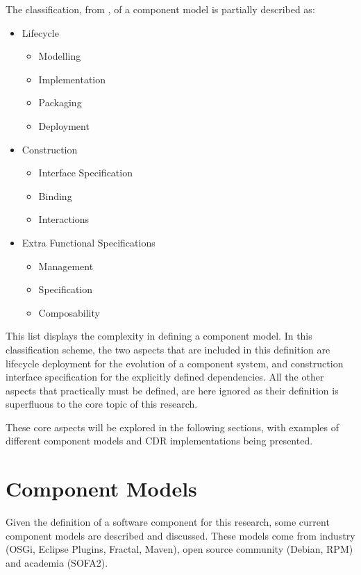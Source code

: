 The classification, from \cite{Crnkovic2011}, of a component model is partially described as:
\begin{itemize}
  \item Lifecycle 
  		\begin{itemize}
	  		\item Modelling
	  		\item Implementation
	  		\item Packaging
	  		\item Deployment
		\end{itemize}
	\item Construction
		\begin{itemize}
	  		\item Interface Specification
	  		\item Binding
	  		\item Interactions 
		\end{itemize}
	\item Extra Functional Specifications
		\begin{itemize}
	  		\item Management
	  		\item Specification
	  		\item Composability
		\end{itemize}	
\end{itemize}  
This list displays the complexity in defining a component model.
In this classification scheme, the two aspects that are included in this definition are lifecycle deployment for the evolution of a component system, 
and construction interface specification for the explicitly defined dependencies.
All the other aspects that practically must be defined, are here ignored as their definition is superfluous to the core topic of this research.

These core aspects will be explored in the following sections, with examples of different component models and CDR implementations being presented.


\section{Component Models}
\label{background.models}
Given the definition of a software component for this research, some current component models are described and discussed.
These models come from industry (OSGi, Eclipse Plugins, Fractal, Maven), open source community (Debian, RPM) and academia (SOFA2).

